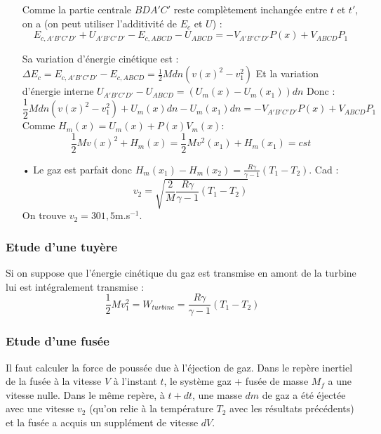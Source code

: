 \documentclass{report}
\begin{document}
\begin{itemize}
Comme la partie centrale $BDA'C'$ reste complètement inchangée entre $t$ et $t'$, on a (on peut utiliser l'additivité de $E_c$ et $U$) : 
\begin{equation}
	E_{c,A'B'C'D'} + U_{A'B'C'D'} - E_{c,ABCD} - U_{ABCD}  = -V_{A'B'C'D'}P(x)+V_{ABCD}P_1
\end{equation}

Sa variation d'énergie cinétique est :
 $\Delta E_c =  E_{c,A'B'C'D'} - E_{c,ABCD} = \frac{1}{2}Mdn\left(v(x)^2-v_1^2\right) $
Et la variation d'énergie interne $U_{A'B'C'D'} - U_{ABCD}=(U_m(x) - U_m(x_1))dn$
Donc : 
	\begin{equation}
	\frac{1}{2}Mdn\left(v(x)^2-v_1^2\right) + U_m(x)dn - U_m(x_1)dn = -V_{A'B'C'D'}P(x)+V_{ABCD}P_1
\end{equation}
Comme $H_m(x) = U_m(x)+P(x)V_m(x)$:
	\begin{equation}
	\frac{1}{2}M v(x)^2+ H_m(x)  =\frac{1}{2}M v^2(x_1) + H_m(x_1) = cst
\end{equation}
\item[•] Le gaz est parfait donc $H_m(x_1)-H_m(x_2)=\frac{R\gamma}{\gamma-1}(T_1-T_2)$. Cad : 
\begin{equation}
	v_2=\sqrt{\frac{2}{M}\frac{R\gamma}{\gamma-1}(T_1-T_2)}
\end{equation}
On trouve $v_2=301,5$m.s$^{-1}$.

\end{itemize}

\subsubsection*{Etude d'une tuyère}
Si on suppose que l'énergie cinétique du gaz est transmise en amont de la turbine lui est intégralement transmise :
\begin{equation}
	\frac{1}{2}Mv_1^2=W_{turbine} = \frac{R\gamma}{\gamma-1}(T_1-T_2)
\end{equation}

\subsubsection*{Etude d'une fusée}
Il faut calculer la force de poussée due à l'éjection de gaz. Dans le repère inertiel de la fusée à la vitesse $V$ à l'instant $t$, le système {gaz + fusée} de masse $M_f$ a une vitesse nulle. Dans le même repère, à $t+dt$, une masse $dm$ de gaz a été éjectée avec une vitesse $v_2$ (qu'on relie à la température $T_2$ avec les résultats précédents) et la fusée a acquis un supplément de vitesse $dV$.
\end{document}
